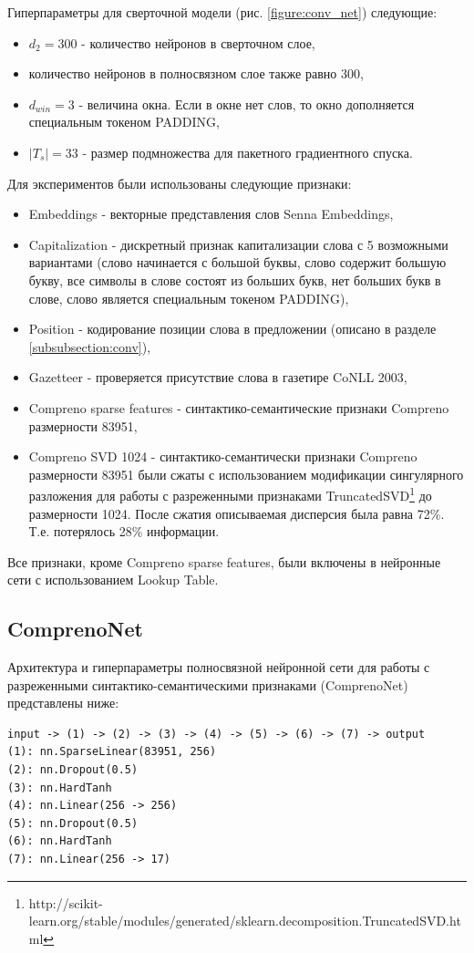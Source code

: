 Гиперпараметры для сверточной модели (рис. \ref{figure:conv_net}) следующие:
\begin{itemize}
\item $d_2 = 300$ - количество нейронов в сверточном слое,
\item количество нейронов в полносвязном слое также равно 300,
\item $d_{win} = 3$ - величина окна. Если в окне нет слов, то окно дополняется специальным токеном PADDING,
\item $|T_s|=33$ - размер подмножества для пакетного градиентного спуска.
\end{itemize}

Для экспериментов были использованы следующие признаки:
\begin{itemize}
\item Embeddings - векторные представления слов Senna Embeddings,
\item Capitalization - дискретный признак капитализации слова с 5 возможными вариантами
(слово начинается с большой буквы, слово содержит большую букву,
все символы в слове состоят из больших букв, нет больших букв в слове,
слово является специальным токеном PADDING),
\item Position - кодирование позиции слова в предложении (описано в разделе \ref{subsubsection:conv}),
\item Gazetteer - проверяется присутствие слова в газетире CoNLL 2003,
\item Compreno sparse features - синтактико-се\-ман\-ти\-ческие признаки Compreno размерности 83951,
\item Compreno SVD 1024 - синтактико-семантически признаки Compreno размерности 83951 были сжаты с использованием
модификации сингулярного разложения для работы с разреженными признаками
TruncatedSVD\footnote{http://scikit-learn.org/stable/modules/generated/sklearn.decomposition.TruncatedSVD.html}
до размерности 1024. После сжатия описываемая дисперсия была равна 72\%. Т.е. потерялось 28\% информации.
\end{itemize}

Все признаки, кроме Compreno sparse features, были включены в нейронные сети с использованием Lookup Table.


\subsection{ComprenoNet}

Архитектура и гиперпараметры полносвязной нейронной сети для работы с разреженными
синтактико-семантическими признаками (ComprenoNet) представлены ниже:
\begin{lstlisting}
input -> (1) -> (2) -> (3) -> (4) -> (5) -> (6) -> (7) -> output
(1): nn.SparseLinear(83951, 256)
(2): nn.Dropout(0.5)
(3): nn.HardTanh
(4): nn.Linear(256 -> 256)
(5): nn.Dropout(0.5)
(6): nn.HardTanh
(7): nn.Linear(256 -> 17)
\end{lstlisting}

